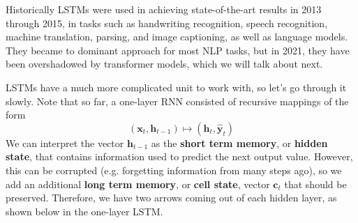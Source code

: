 \documentclass{article}
\begin{document}
  Historically LSTMs were used in achieving state-of-the-art results in 2013 through 2015, in tasks such as handwriting recognition, speech recognition, machine translation, parsing, and image captioning, as well as language models. They became to dominant approach for most NLP tasks, but in 2021, they have been overshadowed by transformer models, which we will talk about next. 

  LSTMs have a much more complicated unit to work with, so let's go through it slowly. Note that so far, a one-layer RNN consisted of recursive mappings of the form 
  \begin{equation}
    (\mathbf{x}_t, \mathbf{h}_{t-1}) \mapsto ( \mathbf{h}_t, \hat{\mathbf{y}}_t)
  \end{equation}
  We can interpret the vector $\mathbf{h}_{t-1}$ as the \textbf{short term memory}, or \textbf{hidden state}, that contains information used to predict the next output value. However, this can be corrupted (e.g. forgetting information from many steps ago), so we add an additional \textbf{long term memory}, or \textbf{cell state}, vector $\mathbf{c}_t$ that should be preserved. Therefore, we have two arrows coming out of each hidden layer, as shown below in the one-layer LSTM. 
\end{document}
